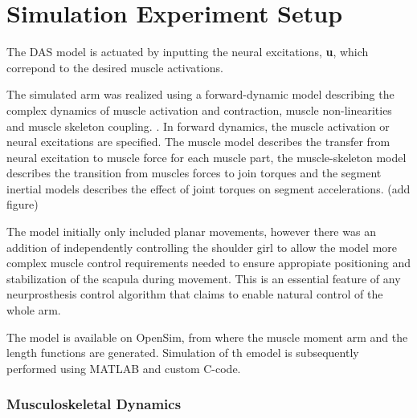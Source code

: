 \chapter{Simulation Experiment Setup}


The DAS model is actuated by inputting the neural excitations, \textbf{u}, which correpond to the desired muscle activations. 

The simulated arm was realized using a forward-dynamic model describing the complex dynamics of muscle activation and contraction, muscle non-linearities and muscle skeleton coupling. \cite{RTS}.
In forward dynamics, the muscle activation or neural excitations are specified. 
The muscle model describes the transfer from neural excitation to muscle force for each muscle part, the muscle-skeleton model describes the transition from muscles forces to join torques and the segment inertial models describes the effect of joint torques on segment accelerations. (add figure) \cite{RTS}

The model initially only included planar movements, however there was an addition of independently controlling the shoulder girl to allow the model more complex muscle control requirements needed to ensure appropiate positioning and stabilization of the scapula during movement. This is an essential feature of any neurprosthesis control algorithm that claims to enable natural control of the whole arm.  \cite{RTS}

The model is available on OpenSim, from where the muscle moment arm and the length functions are generated. Simulation of th emodel is subsequently performed using MATLAB and custom C-code. 

\subsection{ Musculoskeletal Dynamics}

